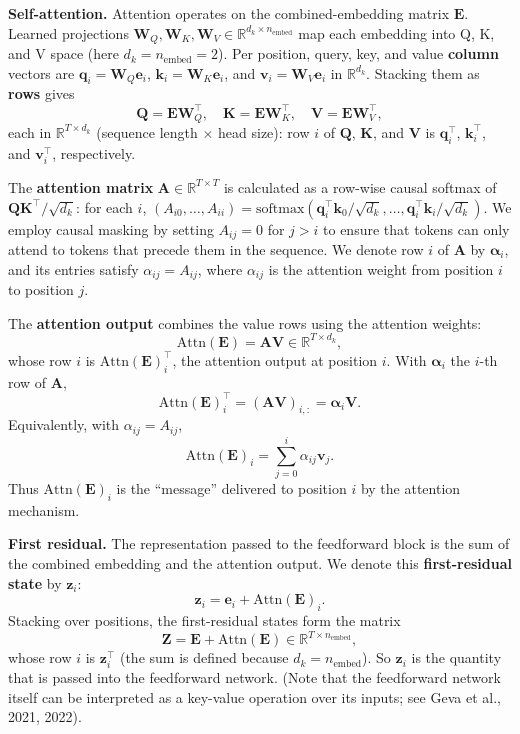 \documentclass[
  11pt,
  a4paper,
]{article}
\begin{document}
\textbf{Self-attention.} Attention operates on the combined-embedding
matrix \(\mathbf{E}\). Learned projections
\(\mathbf{W}_Q, \mathbf{W}_K, \mathbf{W}_V \in \mathbb{R}^{d_k \times n_{\mathrm{embed}}}\)
map each embedding into Q, K, and V space (here
\(d_k = n_{\mathrm{embed}} = 2\)). Per position, query, key, and value
\textbf{column} vectors are
\(\mathbf{q}_i = \mathbf{W}_Q \mathbf{e}_i\),
\(\mathbf{k}_i = \mathbf{W}_K \mathbf{e}_i\), and
\(\mathbf{v}_i = \mathbf{W}_V \mathbf{e}_i\) in \(\mathbb{R}^{d_k}\).
Stacking them as \textbf{rows} gives \[
\mathbf{Q} = \mathbf{E} \mathbf{W}_Q^\top, \quad \mathbf{K} = \mathbf{E} \mathbf{W}_K^\top, \quad \mathbf{V} = \mathbf{E} \mathbf{W}_V^\top,
\] each in \(\mathbb{R}^{T \times d_k}\) (sequence length \(\times\)
head size): row \(i\) of \(\mathbf{Q}\), \(\mathbf{K}\), and
\(\mathbf{V}\) is \(\mathbf{q}_i^\top\), \(\mathbf{k}_i^\top\), and
\(\mathbf{v}_i^\top\), respectively.

The \textbf{attention matrix} \(\mathbf{A} \in \mathbb{R}^{T \times T}\)
is calculated as a row-wise causal softmax of
\(\mathbf{Q}\mathbf{K}^\top/\sqrt{d_k}\): for each \(i\),
\((A_{i0},\ldots,A_{ii}) = \mathrm{softmax}(\mathbf{q}_i^\top\mathbf{k}_0/\sqrt{d_k},\ldots,\mathbf{q}_i^\top\mathbf{k}_i/\sqrt{d_k})\).
We employ causal masking by setting \(A_{ij}=0\) for \(j>i\) to ensure
that tokens can only attend to tokens that precede them in the sequence.
We denote row \(i\) of \(\mathbf{A}\) by \(\boldsymbol{\alpha}_i\), and
its entries satisfy \(\alpha_{ij}=A_{ij}\), where \(\alpha_{ij}\) is the
attention weight from position \(i\) to position \(j\).

The \textbf{attention output} combines the value rows using the
attention weights: \[
\mathrm{Attn}(\mathbf{E}) = \mathbf{A} \mathbf{V} \in \mathbb{R}^{T \times d_k},
\] whose row \(i\) is \(\mathrm{Attn}(\mathbf{E})_i^\top\), the
attention output at position \(i\). With \(\boldsymbol{\alpha}_i\) the
\(i\)-th row of \(\mathbf{A}\), \[
\mathrm{Attn}(\mathbf{E})_i^\top = (\mathbf{A} \mathbf{V})_{i,:} = \boldsymbol{\alpha}_i \mathbf{V}.
\] Equivalently, with \(\alpha_{ij} = A_{ij}\), \[
\mathrm{Attn}(\mathbf{E})_i = \sum_{j=0}^{i} \alpha_{ij} \mathbf{v}_j.
\] Thus \(\mathrm{Attn}(\mathbf{E})_i\) is the ``message'' delivered to
position \(i\) by the attention mechanism.

\textbf{First residual.} The representation passed to the feedforward
block is the sum of the combined embedding and the attention output. We
denote this \textbf{first-residual state} by \(\mathbf{z}_i\): \[
\mathbf{z}_i = \mathbf{e}_i + \mathrm{Attn}(\mathbf{E})_i.
\] Stacking over positions, the first-residual states form the matrix \[
\mathbf{Z} = \mathbf{E} + \mathrm{Attn}(\mathbf{E}) \in \mathbb{R}^{T \times n_{\mathrm{embed}}},
\] whose row \(i\) is \(\mathbf{z}_i^\top\) (the sum is defined because
\(d_k = n_{\mathrm{embed}}\)). So \(\mathbf{z}_i\) is the quantity that
is passed into the feedforward network. (Note that the feedforward
network itself can be interpreted as a key-value operation over its
inputs; see Geva et al., 2021, 2022).
\end{document}
